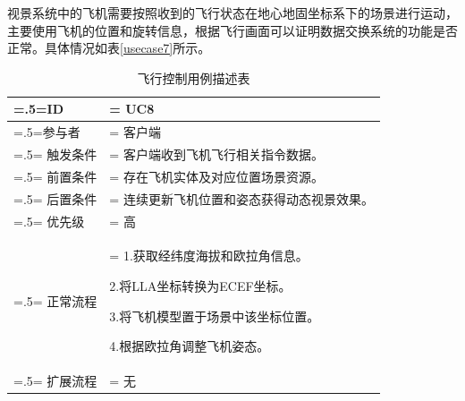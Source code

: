 \par
视景系统中的飞机需要按照收到的飞行状态在地心地固坐标系下的场景进行运动，主要使用飞机的位置和旋转信息，根据飞行画面可以证明数据交换系统的功能是否正常。具体情况如表\ref{usecase7}所示。
\begin{table}[htbp]
    \begin{center}
        \caption{飞行控制用例描述表}
        \label{usecase8}
        \renewcommand\arraystretch{1.5}
        \begin{tabularx}{0.8\textwidth}{ 
            | >{\centering\arraybackslash\hsize=.5\hsize\linewidth=\hsize}X 
            | >{\raggedright\arraybackslash\hsize=1.5\hsize\linewidth=\hsize}X 
            | }
            \hline
            \textbf{ID} & \textbf{UC8}\\
            \hline
            参与者 & 客户端\\
            \hline
            触发条件 & 客户端收到飞机飞行相关指令数据。\\
            \hline
            前置条件 & 存在飞机实体及对应位置场景资源。\\
            \hline
            后置条件 & 连续更新飞机位置和姿态获得动态视景效果。\\
            \hline
            优先级 & 高\\
            \hline
            正常流程 & 1.获取经纬度海拔和欧拉角信息。\par 2.将LLA坐标转换为ECEF坐标。\par 3.将飞机模型置于场景中该坐标位置。\par 4.根据欧拉角调整飞机姿态。\\
            \hline
            扩展流程 & 无\\
            \hline
        \end{tabularx}
    \end{center}
\end{table}




